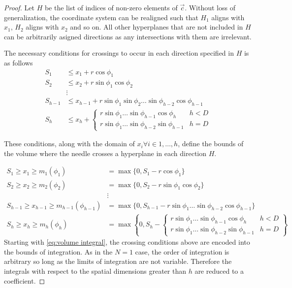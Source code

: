 \documentclass{article}
\begin{document}
\begin{proof}
	Let $H$ be the list of indices of non-zero elements of $\vec{c}$. 
	Without loss of generalization, the coordinate system can be realigned such that
	$H_1$ aligns with $x_1$, $H_2$ aligns with $x_2$ and so on. All other hyperplanes that are not included
	in $H$ can be arbitrarily asigned directions as any intersections with them are irrelevant.

	The necessary conditions for crossings to occur in each direction specified in $H$ is as follows
	\begin{align}
		S_1 &\le x_1 + r\cos\phi_1\\
		S_2 &\le x_2 + r\sin\phi_1\cos\phi_2\\
		&\vdots \\
		S_{h-1} &\le x_{h-1} + r\sin\phi_1\sin\phi_2\hdots\sin\phi_{h-2}\cos\phi_{h-1}\\
		S_{h} &\le x_h + \begin{cases}
			r\sin\phi_1\hdots\sin\phi_{h-1}\cos\phi_{h} & h < D \\
			r\sin\phi_1\hdots\sin\phi_{h-2}\sin\phi_{h-1} & h = D
		\end{cases}
	\end{align}

	These conditions, along with the domain of $x_i \forall i\in {1,\hdots,h}$, define the bounds of the
	volume where the needle crosses a hyperplane in each direction $H$.
	
	\begin{align}
		S_1 \ge x_1 \ge m_1(\phi_1) &= \max\{0, S_1-r\cos\phi_1\}\\
		S_2 \ge x_2 \ge m_2(\phi_2) &= \max\{0, S_2-r\sin\phi_1\cos\phi_2\}\\
		&\vdots \\
		S_{h-1} \ge x_{h-1} \ge m_{h-1}(\phi_{h-1}) &= \max\{0, S_{h-1}-r\sin\phi_1\hdots\sin\phi_{h-2}\cos\phi_{h-1}\}\\
		S_h \ge x_h \ge m_{h}(\phi_{h}) &= \max\left\{0, S_h - \begin{cases}
			r\sin\phi_1\hdots\sin\phi_{h-1}\cos\phi_{h} & h < D\\
			r\sin\phi_1\hdots\sin\phi_{h-2}\sin\phi_{h-1} & h = D
		\end{cases} \right\}
	\end{align}
	Starting with \ref{eq:volume integral}, the crossing conditions above are encoded into
	the bounds of integration. As in the $N=1$ case, the order of integration is arbitrary
	so long as the limits of integration are not variable. Therefore the integrals with respect to the
	spatial dimensions greater than $h$ are reduced to a coefficient.


\end{proof}
\end{document}
